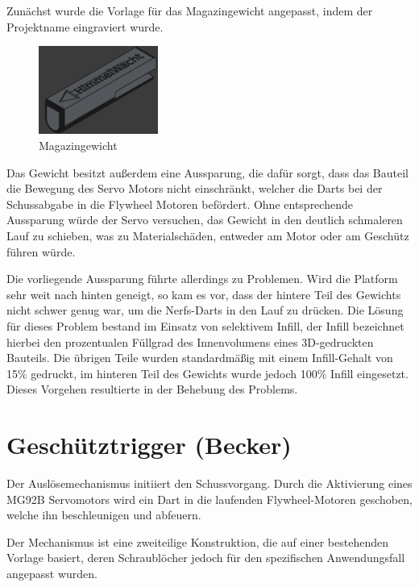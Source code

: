 Zunächst wurde die Vorlage \cite{cad_turret_blueprint} für das Magazingewicht angepasst, indem der Projektname eingraviert wurde.

\begin{figure}[ht]
    \centering
    \includegraphics[width=0.35\textwidth, keepaspectratio]{images/cad_becker_weight.png}
    \caption{Magazingewicht}
\end{figure}

Das Gewicht besitzt außerdem eine Aussparung, die dafür sorgt, dass das Bauteil die Bewegung des Servo Motors nicht einschränkt, welcher die Darts bei der Schussabgabe in die Flywheel Motoren befördert. 
Ohne entsprechende Aussparung würde der Servo versuchen, das Gewicht in den deutlich schmaleren Lauf zu schieben, was zu Materialschäden, entweder am Motor oder am Geschütz führen würde.

Die vorliegende Aussparung führte allerdings zu Problemen. Wird die Platform sehr weit nach hinten geneigt, so kam es vor, dass der hintere Teil des Gewichts nicht schwer genug war, um die Nerfs-Darts in den Lauf zu drücken.
Die Lösung für dieses Problem bestand im Einsatz von selektivem Infill, der Infill bezeichnet hierbei den prozentualen Füllgrad des Innenvolumens eines 3D-gedruckten Bauteils.
Die übrigen Teile wurden standardmäßig mit einem Infill-Gehalt von 15\% gedruckt, im hinteren Teil des Gewichts wurde jedoch 100\% Infill eingesetzt. 
Dieses Vorgehen resultierte in der Behebung des Problems.

\section{Geschütztrigger (Becker)}

Der Auslösemechanismus initiiert den Schussvorgang. Durch die Aktivierung eines MG92B Servomotors wird ein Dart in die laufenden Flywheel-Motoren geschoben, welche ihn
beschleunigen und abfeuern.

Der Mechanismus ist eine zweiteilige Konstruktion, die auf einer bestehenden Vorlage \cite{cad_turret_blueprint} basiert, deren Schraublöcher jedoch für
den spezifischen Anwendungsfall angepasst wurden.

